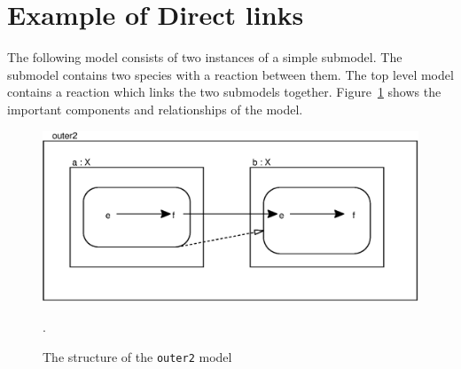 \documentclass{cekarticle}
\begin{document}
\section{Example of Direct links}
\label{sec:egdirectlinks}

The following model consists of two instances of a simple submodel.
The submodel contains two species with a reaction between them.
The top level model contains a reaction which links the two submodels
together.  Figure~\ref{fig:egdirectlinks} shows the important components and relationships 
of the model.
\begin{figure}[h]
  \vspace*{8pt}
  \centering
  \includegraphics[scale = 0.7]{egdirectlinks}
  \caption{The structure of the \texttt{outer2} model}.
  \label{fig:egdirectlinks}
\end{figure}

\pagebreak
\end{document}
